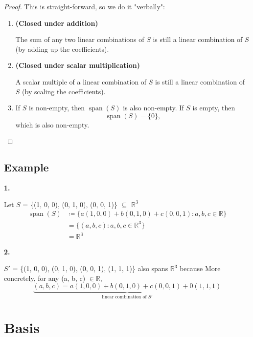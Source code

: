 \documentclass[12pt]{article}
\begin{document}
\begin{proof}
This is straight-forward, so we do it "verbally":

\begin{enumerate}
    \item \textbf{(Closed under addition)}
    
    The sum of any two linear combinations of $S$ is still a linear combination of $S$ (by adding up the coefficients).

    \item \textbf{(Closed under scalar multiplication)}
    
    A scalar multiple of a linear combination of $S$ is still a linear combination of $S$ (by scaling the coefficients).

    \item
    
    If $S$ is non-empty, then $\operatorname{span}(S)$ is also non-empty. If $S$ is empty, then
    \[
        \operatorname{span}(S)=\{0\},
    \]
    which is also non-empty.
\end{enumerate}
\end{proof}

\subsection{Example}

\textbf{1.}

\bigskip

Let $S$ = \{(1, 0, 0), (0, 1, 0), (0, 0, 1)\} $\subseteq$ $\mathbb{R}^{3}$
\begin{align*}
\operatorname{span}(S) 
&\coloneq
\{a(1, 0, 0) + b(0, 1, 0) + c(0, 0, 1) : a, b, c \in \mathbb{R}\}\\
&= 
\{(a, b, c) : a, b, c \in \mathbb{R}^{3}\}\\    
&= 
\mathbb{R}^{3}
\end{align*}

\textbf{2.}

\bigskip

$S'$ = \{(1, 0, 0), (0, 1, 0), (0, 0, 1), (1, 1, 1)\} also spans $\mathbb{R}^{3}$ because
More concretely, for any (a, b, c) $\in \mathbb{R}$,
\[
\underbrace{(a, b, c) = a(1, 0, 0) + b(0, 1, 0) + c(0, 0, 1) + 0(1, 1, 1)
}_{\text{linear combination of $S'$}}
\]

\newpage

\section{Basis}
\end{document}
